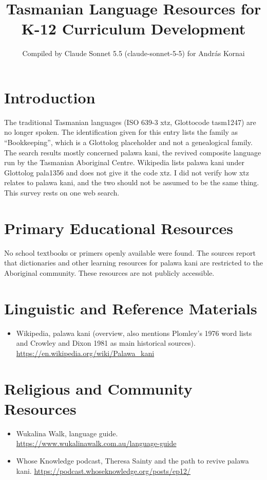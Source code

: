 \documentclass[12pt]{article}
\title{Tasmanian Language Resources for K-12 Curriculum Development}
\author{Compiled by Claude Sonnet 5.5 (claude-sonnet-5-5) for Andr\'as Kornai}
\date{}
\begin{document}
\maketitle

\section{Introduction}
The traditional Tasmanian languages (ISO 639-3 xtz, Glottocode tasm1247) are no longer spoken. The identification given for this entry lists the family as ``Bookkeeping'', which is a Glottolog placeholder and not a genealogical family. The search results mostly concerned palawa kani, the revived composite language run by the Tasmanian Aboriginal Centre. Wikipedia lists palawa kani under Glottolog pala1356 and does not give it the code xtz. I did not verify how xtz relates to palawa kani, and the two should not be assumed to be the same thing. This survey rests on one web search.

\section{Primary Educational Resources}
No school textbooks or primers openly available were found. The sources report that dictionaries and other learning resources for palawa kani are restricted to the Aboriginal community. These resources are not publicly accessible.

\section{Linguistic and Reference Materials}
\begin{itemize}
\item Wikipedia, palawa kani (overview, also mentions Plomley's 1976 word lists and Crowley and Dixon 1981 as main historical sources). \url{https://en.wikipedia.org/wiki/Palawa_kani}
\end{itemize}

\section{Religious and Community Resources}
\begin{itemize}
\item Wukalina Walk, language guide. \url{https://www.wukalinawalk.com.au/language-guide}
\item Whose Knowledge podcast, Theresa Sainty and the path to revive palawa kani. \url{https://podcast.whoseknowledge.org/posts/ep12/}
\end{itemize}
\end{document}
